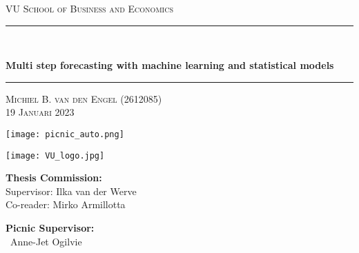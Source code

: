 \vspace*{1mm}
\begin{center}
\Large \textsc{VU School of Business and Economics}
\end{center}
\noindent
\rule{\textwidth}{0.8pt}\\
\begin{center}
{\huge\bf
\noindent
Multi step forecasting with machine learning and statistical models
}
\end{center}
\rule{\textwidth}{0.8pt}
\begin{center}
\Large \textsc{Michiel B. van den Engel (2612085)}\\
\Large \textsc{19 Januari 2023}
\end{center}

\vfill
\centerline{\texttt{[image: picnic\_auto.png]}}
\vfill
\centerline{\texttt{[image: VU\_logo.jpg]}}
\vspace{20mm}
\begin{minipage}[t]{0.47\textwidth}
	\textnormal{{\bf Thesis Commission:\\}}
	{Supervisor: Ilka van der Werve}\\
	{Co-reader: Mirko Armillotta}
\end{minipage}\hfill\begin{minipage}[t]{0.47\textwidth}\raggedleft
	\textnormal{{\bf Picnic Supervisor:\\}}
	{\ Anne-Jet Ogilvie }
\end{minipage}


\clearpage
\begin{abstract}
\noindent In this thesis, we construct ten different models, the local level model in state space representation, the regression model in state space representation, the ARIMA model, the ARIMAX model, the VARIMAX model, the fused lasso model, the XGBoost, the neural network, the multivariate neural network and an ensemble model. These models are then trained on two data sets forecasting the total incoming cases at a customer service department in the Netherlands and in Germany. We then use these models to create three multi step ahead forecasts at 7 steps, 28 steps and 49 steps ahead. We compare these models with measures of quality like MAPE, RMSE, MAE and check if the forecasts by these models are significantly different using the Diebold Mariano test. We conclude that the regression model in state space performs best in Germany and the ARIMAX and fused lasso perform best in the Netherlands, but they the ARIMAX and fused lasso seem to not be significantly different in this regression, the ARIMAX model is preferenced as it uses less computational power.
\end{abstract}
\clearpage